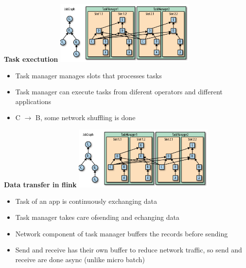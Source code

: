 \documentclass[10pt, landscape]{article}
\begin{document}
\begin{multicols}{4}
\textbf{Task exectution}
\includegraphics*[width=7cm]{task_execution.png}
\begin{itemize}
  \item Task manager manages slots that processes tasks
  \item Task manager can execute tasks from diferent operators and different applications
  \item C $\rightarrow$ B, some network shuffling is done 
\end{itemize}


\textbf{Data transfer in flink}
\includegraphics*[width=7cm]{task_execution.png}
\begin{itemize}
  \item Task of an app is continuously exchanging data 
  \item Task manager takes care ofsending and echanging data 
  \item Network component of task manager buffers the records before sending
  \item Send and receive has their own buffer to reduce network traffic, so send and receive are done async (unlike micro batch)
\end{itemize}


\end{multicols}
\end{document}
